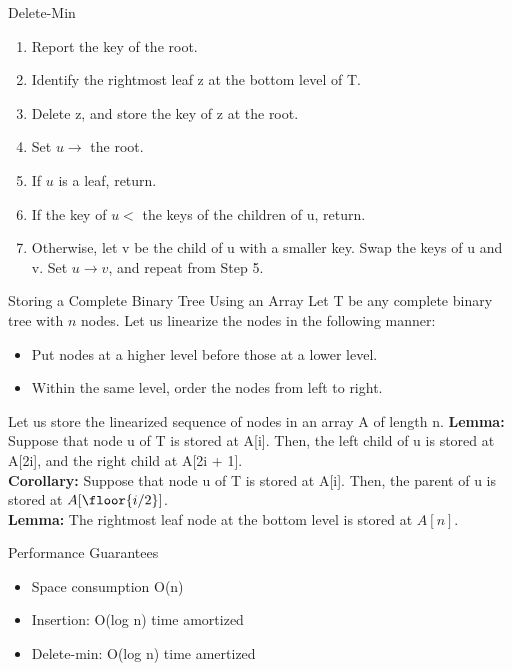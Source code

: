\documentclass{lecture}
\begin{document}
\begin{landscape}
\begin{multicols}{2}
\begin{note}{Delete-Min}
        \begin{enumerate}[nolistsep]
            \item Report the key of the root.
            \item Identify the rightmost leaf z at the bottom level of T.
            \item Delete z, and store the key of z at the root.
            \item Set $u\rightarrow$ the root.
            \item If $u$ is a leaf, return.
            \item If the key of $u <$ the keys of the children of u, return.
            \item Otherwise, let v be the child of u with a smaller key. Swap the keys of u and v. Set $u\rightarrow v$, and repeat from Step 5.
        \end{enumerate}
    \end{note}
    \vfill

    \begin{note}{Storing a Complete Binary Tree Using an Array}
        Let T be any complete binary tree with $n$ nodes. Let us linearize the nodes in the following manner:
        \begin{itemize}[nolistsep]
            \item Put nodes at a higher level before those at a lower level.
            \item Within the same level, order the nodes from left to right.
        \end{itemize}
        Let us store the linearized sequence of nodes in an array A of length n.
        \textbf{Lemma:} Suppose that node u of T is stored at A[i]. Then, the left child of u is stored at A[2i], and the right child at A[2i + 1].\\
        \textbf{Corollary:} Suppose that node u of T is stored at A[i]. Then, the parent of u is stored at $A[\floor{i/2}]$.\\
        \textbf{Lemma:} The rightmost leaf node at the bottom level is stored at $A[n]$.
    \end{note}
    \vfill
    \begin{note}{Performance Guarantees}
        \begin{itemize}
            \item Space consumption O(n)
            \item Insertion: O(log n) time amortized
            \item Delete-min: O(log n) time amertized
        \end{itemize}
    \end{note}
    \vfill


\end{multicols}
\end{landscape}
\end{document}
